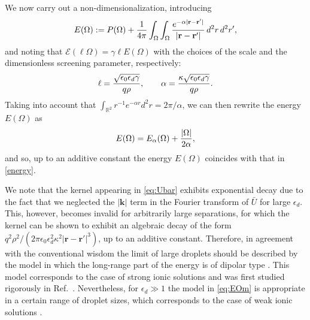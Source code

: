 \documentclass[11pt]{article}
\numberwithin{statement}{section}
\numberwithin{equation}{section}
\theoremstyle{remark}
\newcommand{\R}{\mathbb R} 				%
\begin{document}
We now carry out a non-dimensionalization, introducing
\begin{align}
  \label{eq:EOm}
  E(\Omega) := P(\Omega) + {1 \over 4 \pi} \int_\Omega \int_\Omega
  {e^{-\alpha |\mathbf r - \mathbf r'|} \over |\mathbf r - \mathbf r'|}
  \, d^2 r \, d^2 r',
\end{align}
and noting that $\mathcal E(\ell \Omega) = \gamma \ell E (\Omega)$
with the choices of the scale and the dimensionless screening
parameter, respectively:
\begin{align}
  \ell = {\sqrt{\epsilon_0 \epsilon_d \gamma} \over q \rho}, \qquad
  \alpha = {\kappa \sqrt{\epsilon_0 \epsilon_d \gamma} \over q \rho}. 
\end{align}
Taking into account that
$\int_{\R^2} r^{-1} e^{-\alpha r} d^2 r =2 \pi / \alpha$, we can then
rewrite the energy $E(\Omega)$ as
\begin{align}
  E(\Omega) = E_\alpha(\Omega) + {|\Omega| \over 2 \alpha}, 
\end{align}
and so, up to an additive constant the energy $E(\Omega)$ coincides
with that in \eqref{energy}.

We note that the kernel appearing in \eqref{eq:Ubar} exhibits
exponential decay due to the fact that we neglected the $|\mathbf k|$
term in the Fourier transform of $\bar U$ for large
$\epsilon_d$. This, however, becomes invalid for arbitrarily large
separations, for which the kernel can be shown to exhibit an algebraic
decay of the form
$q^2 \rho^2 /(2 \pi \epsilon_0 \epsilon_d^2 \kappa^2 |\mathbf r -
\mathbf r'|^3)$, up to an additive constant. Therefore, in agreement
with the conventional wisdom the limit of large droplets should be
described by the model in which the long-range part of the energy is
of dipolar type \cite{mcconnell88,andelman85}. This model corresponds
to the case of strong ionic solutions and was first studied rigorously
in Ref.\ \cite{muratov2018nonlocal}. Nevertheless, for
$\epsilon_d \gg 1$ the model in \eqref{eq:EOm} is appropriate in a
certain range of droplet sizes, which corresponds to the case of weak
ionic solutions \cite{andelman87}.

\printbibliography[heading=bibintoc]
\end{document}
